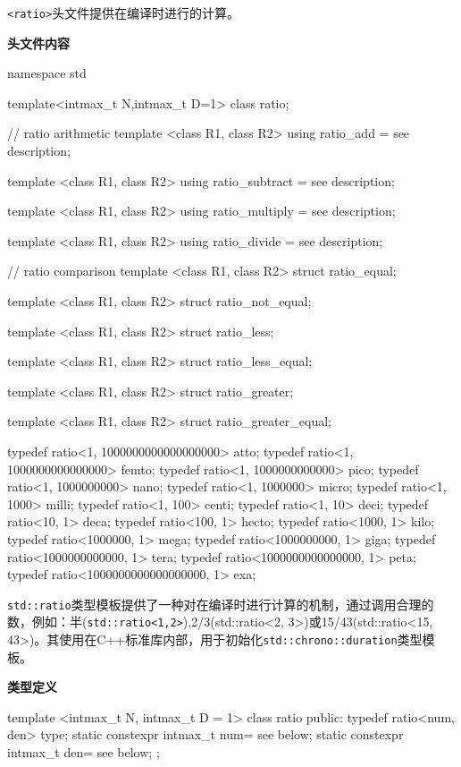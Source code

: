 
\texttt{<ratio>}头文件提供在编译时进行的计算。

\textbf{头文件内容}

\begin{cpp}
namespace std
{
  template<intmax_t N,intmax_t D=1>
  class ratio;

  // ratio arithmetic
  template <class R1, class R2>
  using ratio_add = see description;

  template <class R1, class R2>
  using ratio_subtract = see description;

  template <class R1, class R2>
  using ratio_multiply = see description;

  template <class R1, class R2>
  using ratio_divide = see description;

  // ratio comparison
  template <class R1, class R2>
  struct ratio_equal;

  template <class R1, class R2>
  struct ratio_not_equal;

  template <class R1, class R2>
  struct ratio_less;

  template <class R1, class R2>
  struct ratio_less_equal;

  template <class R1, class R2>
  struct ratio_greater;

  template <class R1, class R2>
  struct ratio_greater_equal;

  typedef ratio<1, 1000000000000000000> atto;
  typedef ratio<1, 1000000000000000> femto;
  typedef ratio<1, 1000000000000> pico;
  typedef ratio<1, 1000000000> nano;
  typedef ratio<1, 1000000> micro;
  typedef ratio<1, 1000> milli;
  typedef ratio<1, 100> centi;
  typedef ratio<1, 10> deci;
  typedef ratio<10, 1> deca;
  typedef ratio<100, 1> hecto;
  typedef ratio<1000, 1> kilo;
  typedef ratio<1000000, 1> mega;
  typedef ratio<1000000000, 1> giga;
  typedef ratio<1000000000000, 1> tera;
  typedef ratio<1000000000000000, 1> peta;
  typedef ratio<1000000000000000000, 1> exa;
}
\end{cpp}


\texttt{std::ratio}类型模板提供了一种对在编译时进行计算的机制，通过调用合理的数，例如：半(\texttt{std::ratio<1,2>}),2/3(std::ratio<2, 3>)或15/43(std::ratio<15, 43>)。其使用在C++标准库内部，用于初始化\texttt{std::chrono::duration}类型模板。

\textbf{类型定义}

\begin{cpp}
template <intmax_t N, intmax_t D = 1>
class ratio
{
public:
  typedef ratio<num, den> type;
  static constexpr intmax_t num= see below;
  static constexpr intmax_t den= see below;
};
\end{cpp}

